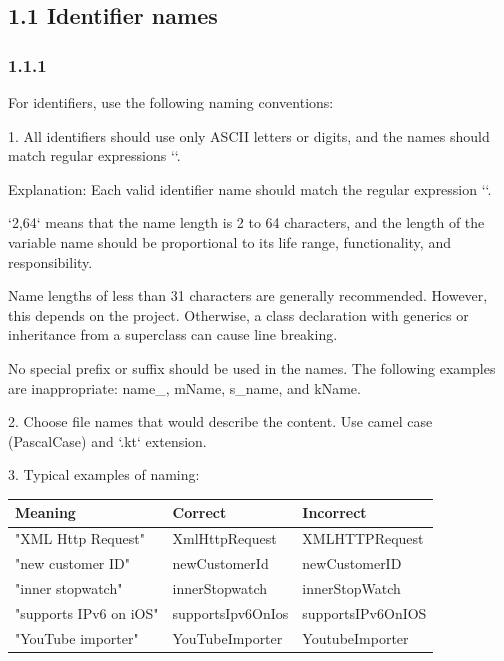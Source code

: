 \subsection*{\textbf{1.1 Identifier names}}

\subsubsection*{\textbf{1.1.1}}
\leavevmode\newline



For identifiers, use the following naming conventions:

1.	All identifiers should use only ASCII letters or digits, and the names should match regular expressions ``.

Explanation: Each valid identifier name should match the regular expression ``.

`{2,64}` means that the name length is 2 to 64 characters, and the length of the variable name should be proportional to its life range, functionality, and responsibility.

Name lengths of less than 31 characters are generally recommended. However, this depends on the project. Otherwise, a class declaration with generics or inheritance from a superclass can cause line breaking.

No special prefix or suffix should be used in the names. The following examples are inappropriate: name\_, mName, s\_name, and kName.



2.	Choose file names that would describe the content. Use camel case (PascalCase) and `.kt` extension.



3.	Typical examples of naming:



\begin{center}

\begin{tabular}{ |p{}|p{}|p{}| }

\hline

Meaning&Correct&Incorrect\\

\hline

 "XML Http Request" & XmlHttpRequest & XMLHTTPRequest \\

 "new customer ID" & newCustomerId & newCustomerID \\

 "inner stopwatch" & innerStopwatch & innerStopWatch \\

 "supports IPv6 on iOS" & supportsIpv6OnIos & supportsIPv6OnIOS \\

 "YouTube importer" & YouTubeImporter & YoutubeImporter \\

\hline

\end{tabular}

\end{center}

